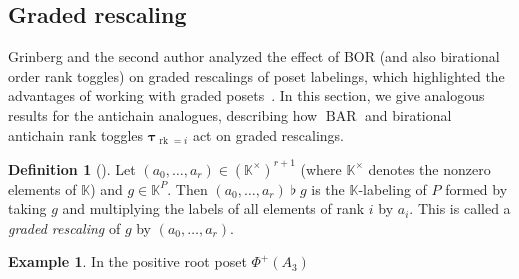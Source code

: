 \documentclass[10pt]{amsart}
\theoremstyle{definition}
\newtheorem{defi}[theo]{Definition}
\newtheorem{exam}[theo]{Example}
\newcommand{\defn}[1]{\emph{#1}}
\newcommand{\kk}{\mathbb{K}}
\DeclareMathOperator{\rk}{rk}
\DeclareMathOperator{\BAR}{BAR}
\newcommand{\rktau}[1]{\boldsymbol{\tau}_{\rk=#1}}
\newcommand{\flatbin}{\mathbin{\flat}}
\begin{document}
\subsection{Graded rescaling}\label{ss:g-rescaling}

Grinberg and the second author analyzed the effect of BOR (and also birational order rank
toggles) on graded rescalings of poset labelings, which highlighted the advantages of working with
graded posets~\cite{GrRo16}. In this section, we give analogous results for the antichain
analogues, describing how $\BAR$ and birational antichain rank toggles $\rktau{i}$ act on
graded rescalings.

\begin{defi}[{\cite[\S~6]{GrRo16}}]\label{defn:graded_resc}
Let $(a_0,\dots,a_r)\in(\kk^\times)^{r+1}$ (where $\kk^{\times}$ denotes the nonzero elements of
$\kk$) and
$g\in\kk^P$.
Then $(a_0,\dots,a_r)\flatbin g$ is the $\kk$-labeling of $P$
formed by taking $g$ and multiplying the labels of all elements of rank $i$
by $a_i$. This is called a \defn{graded rescaling} of $g$ by $(a_0,\dots,a_r)$.
\end{defi}

\begin{exam}In the positive root poset $\Phi^+(A_3)$

\begin{center}
\end{center}
\end{exam}
\end{document}
